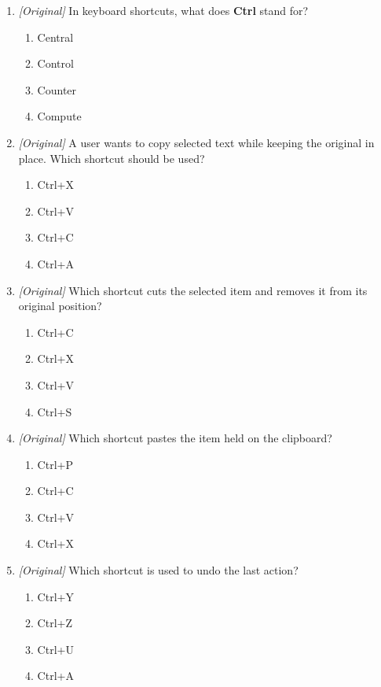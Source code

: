 \begin{enumerate}[label=\textbf{Q\arabic*.}, leftmargin=*]
\item \textit{[Original]} In keyboard shortcuts, what does \textbf{Ctrl}
  stand for?
  \begin{enumerate}[label=\Alph*.]
    \item Central
    \item Control
    \item Counter
    \item Compute
  \end{enumerate}
\item \textit{[Original]} A user wants to copy selected text while keeping the
  original in place. Which shortcut should be used?
  \begin{enumerate}[label=\Alph*.]
    \item Ctrl+X
    \item Ctrl+V
    \item Ctrl+C
    \item Ctrl+A
  \end{enumerate}
\item \textit{[Original]} Which shortcut cuts the selected item and removes it
  from its original position?
  \begin{enumerate}[label=\Alph*.]
    \item Ctrl+C
    \item Ctrl+X
    \item Ctrl+V
    \item Ctrl+S
  \end{enumerate}
\item \textit{[Original]} Which shortcut pastes the item held on the
  clipboard?
  \begin{enumerate}[label=\Alph*.]
    \item Ctrl+P
    \item Ctrl+C
    \item Ctrl+V
    \item Ctrl+X
  \end{enumerate}
\item \textit{[Original]} Which shortcut is used to undo the last action?
  \begin{enumerate}[label=\Alph*.]
    \item Ctrl+Y
    \item Ctrl+Z
    \item Ctrl+U
    \item Ctrl+A
  \end{enumerate}

\end{enumerate}
